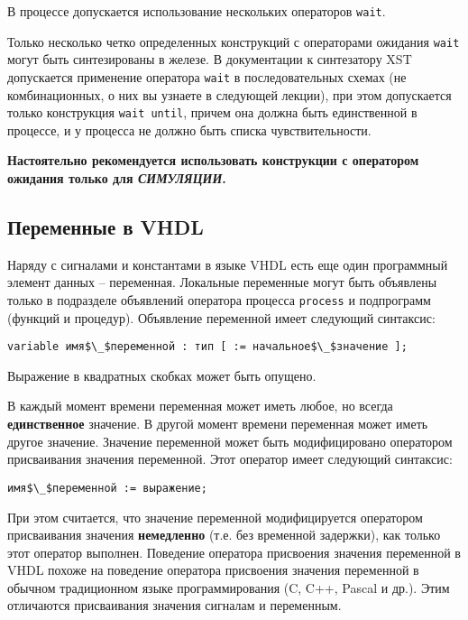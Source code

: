 В процессе допускается использование нескольких операторов \lstinline?wait?.

 Только несколько четко определенных конструкций с операторами ожидания \lstinline?wait? могут быть синтезированы в железе. В документации к синтезатору XST допускается применение оператора \lstinline?wait? в последовательных схемах (не комбинационных, о них вы узнаете в следующей лекции), при этом допускается только конструкция \lstinline?wait until?, причем она должна быть единственной в процессе, и у процесса не должно быть списка чувствительности.

\textbf{Настоятельно рекомендуется использовать конструкции с оператором ожидания только для \emph{СИМУЛЯЦИИ}.}

\subsection{Переменные в VHDL}

Наряду с сигналами и константами в языке VHDL есть еще один программный элемент данных – переменная. Локальные переменные могут быть объявлены только в подразделе объявлений оператора процесса \lstinline?process? и подпрограмм (функций и процедур). Объявление переменной имеет следующий синтаксис:

\begin{Code}
\begin{lstlisting}[mathescape]
variable имя$\_$переменной : тип [ := начальное$\_$значение ];
\end{lstlisting}
\end{Code}

Выражение в квадратных скобках может быть опущено.

В каждый момент времени переменная может иметь любое, но всегда \textbf{единственное} значение. В другой момент времени переменная может иметь другое значение. Значение переменной может быть модифицировано оператором присваивания значения переменной. Этот оператор имеет следующий синтаксис:

\begin{Code}
\begin{lstlisting}[mathescape]
 имя$\_$переменной := выражение;
\end{lstlisting}
\end{Code}

При этом считается, что значение переменной модифицируется оператором присваивания значения \textbf{немедленно} (т.е. без временной задержки), как только этот оператор выполнен. Поведение оператора присвоения значения переменной в VHDL похоже на поведение оператора присвоения значения переменной в обычном традиционном языке программирования (C, C++, Pascal и др.). Этим отличаются присваивания значения сигналам и переменным.

